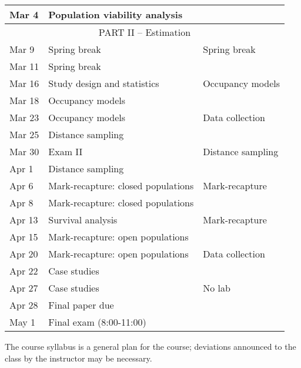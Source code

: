 \documentclass[12pt]{article}
\begin{document}
\begin{center}
\begin{tabular}[c]{lll}
Mar 4      & Population viability analysis      &                                   \\
\hline
           \multicolumn{3}{c}{PART II -- Estimation}                                \\
\hline
Mar 9     & Spring break                       & Spring break                      \\
Mar 11     & Spring break                       &                                   \\
\hline
Mar 16     & Study design and statistics        & Occupancy models                  \\
Mar 18     & Occupancy models                   &                                   \\
\hline
Mar 23     & Occupancy models                   & Data collection                   \\
Mar 25     & Distance sampling                  &                                   \\
\hline
Mar 30      & Exam II                            & Distance sampling                 \\
Apr 1      & Distance sampling                  &                                   \\
\hline
Apr 6      & Mark-recapture: closed populations & Mark-recapture                    \\
Apr 8     & Mark-recapture: closed populations &                                   \\
\hline
Apr 13     & Survival analysis                  & Mark-recapture                    \\
Apr 15     & Mark-recapture: open populations   &                                   \\
\hline
Apr 20     & Mark-recapture: open populations   & Data collection                   \\
Apr 22     & Case studies                       &                                   \\
\hline
Apr 27     & Case studies                       & No lab                            \\
Apr 28     & Final paper due                    &                                   \\
\hline
May  1     & Final exam (8:00-11:00)            &                                   \\
\hline \hline
\end{tabular}
\end{center}

The course syllabus is a general plan for the course; deviations announced to the class by the instructor may be necessary.
\end{document}
